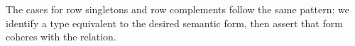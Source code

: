 \documentclass[sigplan,screen]{acmart}
\begin{document}
\begin{AgdaAlign}
\begin{code}%
%
\>[2]\AgdaSpace{}%
\AgdaSymbol{\{}\AgdaSymbol{\}}\AgdaSpace{}%
\AgdaSymbol{\{}\AgdaSpace{}%
\AgdaSymbol{=}\AgdaSpace{}%
\AgdaOperator{\AgdaInductiveConstructor{R[}}\AgdaSpace{}%
\AgdaSpace{}%
\AgdaOperator{\AgdaInductiveConstructor{]}}\AgdaSymbol{\}}\AgdaSpace{}%
\AgdaSpace{}%
\AgdaSymbol{(}\AgdaSpace{}%
\AgdaOperator{\AgdaInductiveConstructor{\$}}\AgdaSpace{}%
\AgdaSymbol{)}\AgdaSpace{}%
\AgdaSymbol{=}\<%
\\
\>[2][@{}l@{\AgdaIndent{0}}]%
\>[4]\AgdaFunction{Σ[}\AgdaSpace{}%
\AgdaSpace{}%
\AgdaSpace{}%
\AgdaSymbol{(}\AgdaSpace{}%
\AgdaSpace{}%
\AgdaSymbol{(\AgdaUnderscore{}}\AgdaSpace{}%
\AgdaSpace{}%
\AgdaSymbol{))}\AgdaSpace{}%
\AgdaFunction{]}\<%
\\
\>[4][@{}l@{\AgdaIndent{0}}]%
\>[6]\AgdaSymbol{((}\AgdaSpace{}%
\AgdaSpace{}%
\AgdaSpace{}%
\AgdaOperator{\AgdaInductiveConstructor{\$}}\AgdaSpace{}%
\AgdaSpace{}%
\AgdaSymbol{)}\AgdaSpace{}%
\AgdaSpace{}%
\AgdaSpace{}%
\AgdaSpace{}%
\AgdaSymbol{)}\<%
\end{code}
\end{AgdaAlign}

\Ni The cases for row singletons and row complements follow the same pattern: we identify a type equivalent to the desired semantic form, then assert that form coheres with the relation.
\end{document}
